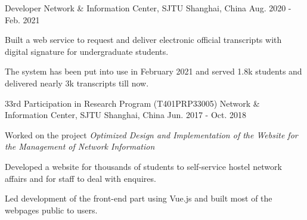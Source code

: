 \begin{cventries}


    \cventry
    {Developer} %
    {Network \& Information Center, SJTU} %
    {Shanghai, China} %
    {Aug. 2020 - Feb. 2021} %
    { %
        \begin{cvitems}
            \item Built a web service to request and deliver electronic official transcripts with digital signature for undergraduate students.
            \item The system has been put into use in February 2021 and served 1.8k students and delivered nearly 3k transcripts till now.
        \end{cvitems}
    }




    \cventry
    {33rd Participation in Research Program (T401PRP33005)} %
    {Network \& Information Center, SJTU} %
    {Shanghai, China} %
    {Jun. 2017 - Oct. 2018} %
    { %
        \begin{cvitems}
            \item Worked on the project \textit{Optimized Design and Implementation of the Website for the Management of Network Information}
            \item Developed a website for thousands of students to self-service hostel network affairs and for staff to deal with enquires.
            \item Led development of the front-end part using Vue.js and built most of the webpages public to users.
        \end{cvitems}
    }


\end{cventries}
